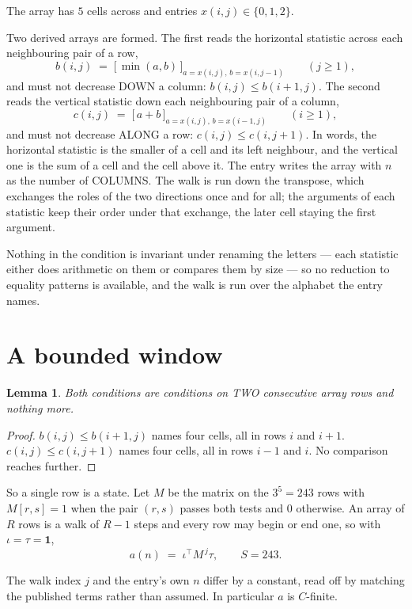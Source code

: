 \documentclass[11pt,a4paper]{article}
\theoremstyle{plain}
\newtheorem{lemma}[theorem]{Lemma}
\theoremstyle{definition}
\begin{document}
The array has $5$ cells across and entries $x(i,j)\in\{0,1,2\}$.

Two derived arrays are formed. The first reads the horizontal statistic across each
neighbouring pair of a row,
\[
b(i,j)\;=\;\bigl[\,\min(a,b)\,\bigr]_{a=x(i,j),\,b=x(i,j-1)}\qquad (j\ge1),
\]
and must not decrease DOWN a column: $b(i,j)\le b(i{+}1,j)$. The second reads the vertical
statistic down each neighbouring pair of a column,
\[
c(i,j)\;=\;\bigl[\,a+b\,\bigr]_{a=x(i,j),\,b=x(i{-}1,j)}\qquad (i\ge1),
\]
and must not decrease ALONG a row: $c(i,j)\le c(i,j{+}1)$. In words, the horizontal statistic
is the smaller of a cell and its left neighbour, and the vertical one is
the sum of a cell and the cell above it. The entry writes the array with $n$ as the number of COLUMNS. The walk is run down the transpose, which exchanges the roles of the two directions once and for all; the arguments of each statistic keep their order under that exchange, the later cell staying the first argument.

Nothing in the condition is invariant under renaming the letters --- each statistic either does
arithmetic on them or compares them by size --- so no reduction to equality patterns is
available, and the walk is run over the alphabet the entry names.

\section{A bounded window}

\begin{lemma}\label{lem:win}
Both conditions are conditions on TWO consecutive array rows and nothing more.
\end{lemma}

\begin{proof}
$b(i,j)\le b(i{+}1,j)$ names four cells, all in rows $i$ and $i+1$. $c(i,j)\le c(i,j{+}1)$
names four cells, all in rows $i-1$ and $i$. No comparison reaches further.
\end{proof}

So a single row is a state. Let $M$ be the matrix on the $3^{5}=243$ rows with
$M[r,s]=1$ when the pair $(r,s)$ passes both tests and $0$ otherwise. An array of $R$ rows is a
walk of $R-1$ steps and every row may begin or end one, so with $\iota=\tau=\mathbf{1}$,
\[
a(n)\;=\;\iota^{\!\top}M^{\,j}\tau ,\qquad S=243.
\]

The walk index $j$ and the entry's own $n$ differ by a constant, read off by matching the
published terms rather than assumed. In particular $a$ is $C$-finite.
\end{document}
